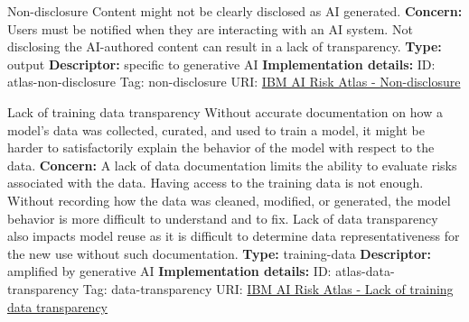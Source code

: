 \documentclass[a4paper,12pt]{article}
\begin{document}
\begin{definitionbox}{Non-disclosure}
Content might not be clearly disclosed as AI generated.\newline\newline
\textbf{Concern: }Users must be notified when they are interacting with an AI system. Not disclosing the AI-authored content can result in a lack of transparency.\newline\newline
\textbf{Type: }output\newline
\textbf{Descriptor: }specific to generative AI \newline\newline
\textbf{Implementation details: } \newline
ID: atlas-non-disclosure \newline
Tag: non-disclosure \newline
URI:  \href{https://www.ibm.com/docs/en/watsonx/saas?topic=SSYOK8/wsj/ai-risk-atlas/non-disclosure.html}{IBM AI Risk Atlas - Non-disclosure}\newline
\end{definitionbox}
\begin{definitionbox}{Lack of training data transparency}
Without accurate documentation on how a model's data was collected, curated, and used to train a model, it might be harder to satisfactorily explain the behavior of the model with respect to the data.\newline\newline
\textbf{Concern: }A lack of data documentation limits the ability to evaluate risks associated with the data. Having access to the training data is not enough. Without recording how the data was cleaned, modified, or generated, the model behavior is more difficult to understand and to fix. Lack of data transparency also impacts model reuse as it is difficult to determine data representativeness for the new use without such documentation.\newline\newline
\textbf{Type: }training-data\newline
\textbf{Descriptor: }amplified by generative AI \newline\newline
\textbf{Implementation details: } \newline
ID: atlas-data-transparency \newline
Tag: data-transparency \newline
URI:  \href{https://www.ibm.com/docs/en/watsonx/saas?topic=SSYOK8/wsj/ai-risk-atlas/data-transparency.html}{IBM AI Risk Atlas - Lack of training data transparency}\newline
\end{definitionbox}
\end{document}
